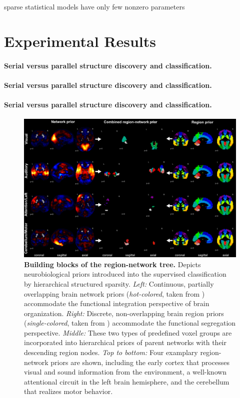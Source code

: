 \documentclass{article} %
\begin{document}
sparse statistical models have only few nonzero parameters








\section{Experimental Results}
\paragraph{Serial versus parallel structure discovery and classification.}
\paragraph{Serial versus parallel structure discovery and classification.}
\paragraph{Serial versus parallel structure discovery and classification.}


\begin{figure}
\begin{centering}
\includegraphics[width=1.00\textwidth]{figures/reg_net_prior.pdf}
\end{centering}
\vspace{-0.6cm}
\caption{\textbf{Building blocks of the region-network tree.}
Depicts neurobiological priors introduced into the supervised classification
by hierarchical structured sparsity.
\textit{Left:} Continuous, partially overlapping brain network priors
(\textit{hot-colored}, taken from \cite{smith2009})
accommodate the functional integration
perspective of brain organization.
\textit{Right:} Discrete, non-overlapping brain region priors
(\textit{single-colored}, taken from \cite{crad12})
accommodate the functional segregation perspective.
\textit{Middle:} These two types of predefined voxel groups are incorporated
into hierarchical priors of parent networks with their
descending region nodes.
\textit{Top to bottom:} Four examplary region-network priors
are shown, including
the early cortex that processes
visual and sound information from the environment,
a well-known attentional circuit in the left brain hemisphere,
and
the cerebellum that realizes motor behavior.
}
\label{fig_priors}
\end{figure}
\end{document}
